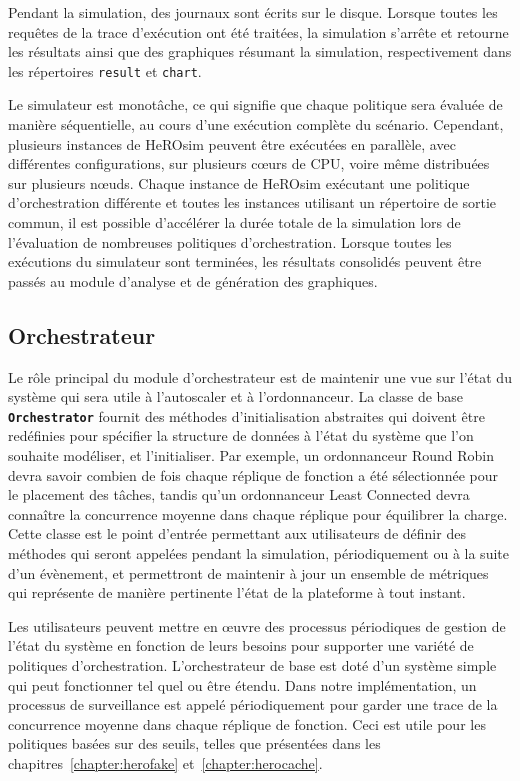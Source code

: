 Pendant la simulation, des journaux sont écrits sur le disque. Lorsque toutes les requêtes de la trace d'exécution ont été traitées, la simulation s'arrête et retourne les résultats ainsi que des graphiques résumant la simulation, respectivement dans les répertoires \texttt{result} et \texttt{chart}.

Le simulateur est monotâche, ce qui signifie que chaque politique sera évaluée de manière séquentielle, au cours d'une exécution complète du scénario. Cependant, plusieurs instances de HeROsim peuvent être exécutées en parallèle, avec différentes configurations, sur plusieurs cœurs de CPU, voire même distribuées sur plusieurs nœuds. Chaque instance de HeROsim exécutant une politique d'orchestration différente et toutes les instances utilisant un répertoire de sortie commun, il est possible d'accélérer la durée totale de la simulation lors de l'évaluation de nombreuses politiques d'orchestration. Lorsque toutes les exécutions du simulateur sont terminées, les résultats consolidés peuvent être passés au module d'analyse et de génération des graphiques.

\subsection{Orchestrateur}

Le rôle principal du module d'orchestrateur est de maintenir une vue sur l'état du système qui sera utile à l'autoscaler et à l'ordonnanceur. La classe de base \textbf{\texttt{Orchestrator}} fournit des méthodes d'initialisation abstraites qui doivent être redéfinies pour spécifier la structure de données à l'état du système que l'on souhaite modéliser, et l'initialiser. Par exemple, un ordonnanceur Round Robin devra savoir combien de fois chaque réplique de fonction a été sélectionnée pour le placement des tâches, tandis qu'un ordonnanceur Least Connected devra connaître la concurrence moyenne dans chaque réplique pour équilibrer la charge. Cette classe est le point d'entrée permettant aux utilisateurs de définir des méthodes qui seront appelées pendant la simulation, périodiquement ou à la suite d'un évènement, et permettront de maintenir à jour un ensemble de métriques qui représente de manière pertinente l'état de la plateforme à tout instant.

Les utilisateurs peuvent mettre en œuvre des processus périodiques de gestion de l'état du système en fonction de leurs besoins pour supporter une variété de politiques d'orchestration. L'orchestrateur de base est doté d'un système simple qui peut fonctionner tel quel ou être étendu. Dans notre implémentation, un processus de surveillance est appelé périodiquement pour garder une trace de la concurrence moyenne dans chaque réplique de fonction. Ceci est utile pour les politiques basées sur des seuils, telles que présentées dans les chapitres~\ref{chapter:herofake} et~\ref{chapter:herocache}.

